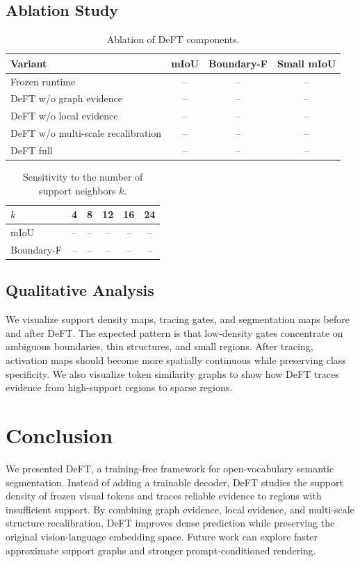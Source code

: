 \documentclass[letterpaper]{article}
\begin{document}
\subsection{Ablation Study}

\begin{table}[t]
\centering
\caption{Ablation of DeFT components.}
\begin{tabular}{lccc}
\toprule
Variant & mIoU & Boundary-F & Small mIoU \\
\midrule
Frozen runtime & -- & -- & -- \\
DeFT w/o graph evidence & -- & -- & -- \\
DeFT w/o local evidence & -- & -- & -- \\
DeFT w/o multi-scale recalibration & -- & -- & -- \\
DeFT full & -- & -- & -- \\
\bottomrule
\end{tabular}
\end{table}

\begin{table}[t]
\centering
\caption{Sensitivity to the number of support neighbors $k$.}
\begin{tabular}{lccccc}
\toprule
$k$ & 4 & 8 & 12 & 16 & 24 \\
\midrule
mIoU & -- & -- & -- & -- & -- \\
Boundary-F & -- & -- & -- & -- & -- \\
\bottomrule
\end{tabular}
\end{table}

\subsection{Qualitative Analysis}

We visualize support density maps, tracing gates, and segmentation maps before
and after DeFT. The expected pattern is that low-density gates concentrate on
ambiguous boundaries, thin structures, and small regions. After tracing,
activation maps should become more spatially continuous while preserving class
specificity. We also visualize token similarity graphs to show how DeFT traces
evidence from high-support regions to sparse regions.

\section{Conclusion}

We presented DeFT, a training-free framework for open-vocabulary semantic
segmentation. Instead of adding a trainable decoder, DeFT studies the support
density of frozen visual tokens and traces reliable evidence to regions with
insufficient support. By combining graph evidence, local evidence, and
multi-scale structure recalibration, DeFT improves dense prediction while
preserving the original vision-language embedding space. Future work can explore
faster approximate support graphs and stronger prompt-conditioned rendering.



\end{document}
